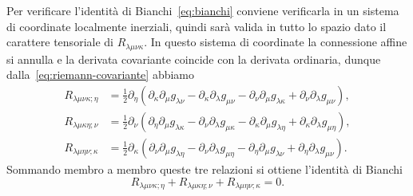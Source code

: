 Per verificare l'identità di
Bianchi~\eqref{eq:bianchi} conviene verificarla in un sistema di coordinate
localmente inerziali, quindi sarà valida in tutto lo spazio dato il carattere
tensoriale di $R_{\lambda\mu\nu\kappa}$.  In questo sistema di coordinate la
connessione affine si annulla e la derivata covariante coincide con la derivata
ordinaria, dunque dalla~\eqref{eq:riemann-covariante} abbiamo
\begin{subequations}
  \begin{align}
    R_{\lambda\mu\nu\kappa;\eta} &=
    \frac{1}{2} \partial_{\eta}(\partial_{\kappa} \partial_{\mu} g_{\lambda\nu}
    - \partial_{\kappa} \partial_{\lambda} g_{\mu\nu}
    - \partial_{\nu} \partial_{\mu} g_{\lambda\kappa}
    + \partial_{\nu} \partial_{\lambda} g_{\mu\nu}), \\
    R_{\lambda\mu\kappa\eta;\nu} &=
    \frac{1}{2} \partial_{\nu}(\partial_{\eta} \partial_{\mu} g_{\lambda\kappa}
    - \partial_{\nu} \partial_{\lambda} g_{\mu\kappa}
    - \partial_{\kappa} \partial_{\mu} g_{\lambda\eta}
    + \partial_{\kappa} \partial_{\lambda} g_{\mu\eta}), \\
    R_{\lambda\mu\eta\nu;\kappa} &= \frac{1}{2} \partial_{\kappa}(\partial_{\nu}
    \partial_{\mu} g_{\lambda\eta} - \partial_{\nu} \partial_{\lambda}
    g_{\mu\eta} - \partial_{\eta} \partial_{\mu} g_{\lambda\nu}
    + \partial_{\eta} \partial_{\lambda} g_{\mu\nu}).
  \end{align}
\end{subequations}
Sommando membro a membro queste tre relazioni si ottiene l'identità di Bianchi
\begin{equation}
  R_{\lambda\mu\nu\kappa;\eta} + R_{\lambda\mu\kappa\eta;\nu} +
  R_{\lambda\mu\eta\nu;\kappa} = 0.
\end{equation}


